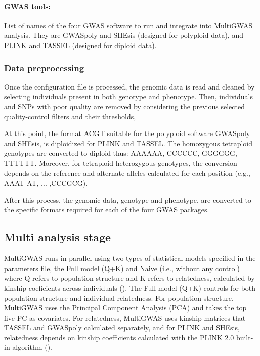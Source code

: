 \documentclass{article}
\begin{document}
\paragraph{{GWAS tools:}}
List of names of the four GWAS software to run and integrate into MultiGWAS analysis. They are GWASpoly and SHEsis (designed for polyploid data), and PLINK and TASSEL (designed for diploid data). %

\subsubsection{Data preprocessing}

Once the configuration file is processed, the genomic data is read and cleaned by selecting individuals present in both genotype and phenotype. Then, individuals and SNPs with poor quality are removed by considering the previous selected quality-control filters and their thresholds, 

At this point, the format \textquotedbl{}ACGT\textquotedbl{} suitable for the polyploid software GWASpoly and SHEsis, is \textquotedbl{}diploidized\textquotedbl{} for PLINK and TASSEL. The homozygous tetraploid genotypes are converted to diploid thus: AAAA\textrightarrow AA, CCCC\textrightarrow CC, GGGG\textrightarrow GG, TTTT\textrightarrow TT. Moreover, for tetraploid heterozygous genotypes, the conversion depends on the reference and alternate alleles calculated for each position (e.g., AAAT \textrightarrow AT, ... ,CCCG\textrightarrow CG). 

After this process, the genomic data, genotype and phenotype, are converted to the specific formats required for each of the four GWAS packages.

\subsection{Multi analysis stage}
MultiGWAS runs in parallel using two types of statistical models specified in the parameters file, the Full model (Q+K) and Naive (i.e., without any control) where Q refers to population structure and K refers to relatedness, calculated by kinship coeficients across individuals (\cite{Sharma2018}). The Full model (Q+K) controls for both population structure and individual relatedness. For population structure, MultiGWAS uses the Principal Component Analysis (PCA) and takes the top five PC as covariates. For relatedness, MultiGWAS uses kinship matrices that TASSEL and GWASpoly calculated separately, and for PLINK and SHEsis, relatedness depends on kinship coefficients calculated with the PLINK 2.0 built-in algorithm (\cite{Chang2015}). 
\end{document}
